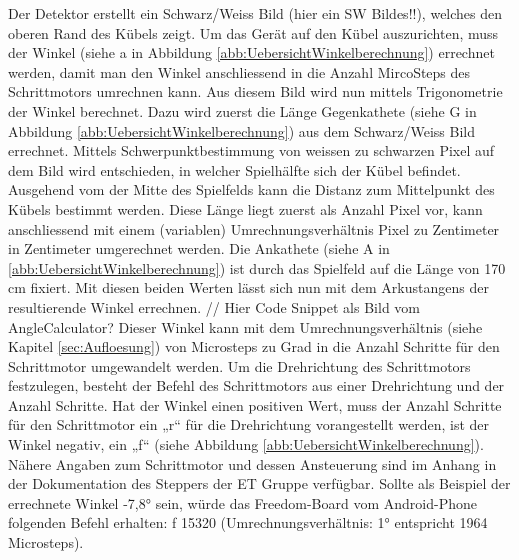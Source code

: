 Der Detektor erstellt ein Schwarz/Weiss Bild (hier ein SW Bildes!!), welches den oberen Rand des Kübels zeigt. 
Um das Gerät auf den Kübel auszurichten, muss der Winkel (siehe a in Abbildung \ref{abb:UebersichtWinkelberechnung}) errechnet werden, 
damit man den Winkel anschliessend in die Anzahl MircoSteps des Schrittmotors umrechnen kann.
\newline
\newline
Aus diesem Bild wird nun mittels Trigonometrie der Winkel berechnet. 
Dazu wird zuerst die Länge Gegenkathete (siehe G in Abbildung \ref{abb:UebersichtWinkelberechnung}) 
aus dem Schwarz/Weiss Bild errechnet. Mittels Schwerpunktbestimmung von weissen zu schwarzen Pixel auf dem Bild wird entschieden, 
in welcher Spielhälfte sich der Kübel befindet. Ausgehend vom der Mitte des Spielfelds kann die Distanz zum Mittelpunkt des 
Kübels bestimmt werden. Diese Länge liegt zuerst als Anzahl Pixel vor, 
  kann anschliessend mit einem (variablen) Umrechnungsverhältnis Pixel zu Zentimeter in Zentimeter umgerechnet werden.
Die Ankathete (siehe A in \ref{abb:UebersichtWinkelberechnung}) ist durch das Spielfeld auf die Länge von 170 cm fixiert. 
Mit diesen beiden Werten lässt sich nun mit dem Arkustangens der resultierende Winkel errechnen.
\newline
\newline
// Hier Code Snippet als Bild vom AngleCalculator?
\newline
\newline
Dieser Winkel kann mit dem Umrechnungsverhältnis (siehe Kapitel \ref{sec:Aufloesung}) von Microsteps zu Grad 
in die Anzahl Schritte für den Schrittmotor umgewandelt werden. Um die Drehrichtung des Schrittmotors festzulegen, besteht der 
Befehl des Schrittmotors aus einer Drehrichtung und der Anzahl Schritte. Hat der Winkel einen positiven Wert, muss der Anzahl 
Schritte für den Schrittmotor ein „r“ für die Drehrichtung vorangestellt werden, ist der Winkel negativ, ein „f“ 
(siehe Abbildung \ref{abb:UebersichtWinkelberechnung}).  
\newline
\newline
Nähere Angaben zum Schrittmotor und dessen Ansteuerung sind im Anhang in der Dokumentation des Steppers der ET Gruppe verfügbar.
\newline
\newline
Sollte als Beispiel der errechnete Winkel -7,8° sein, würde das Freedom-Board vom Android-Phone folgenden 
Befehl erhalten: f 15320 (Umrechnungsverhältnis: 1° entspricht 1964 Microsteps).
\newline
